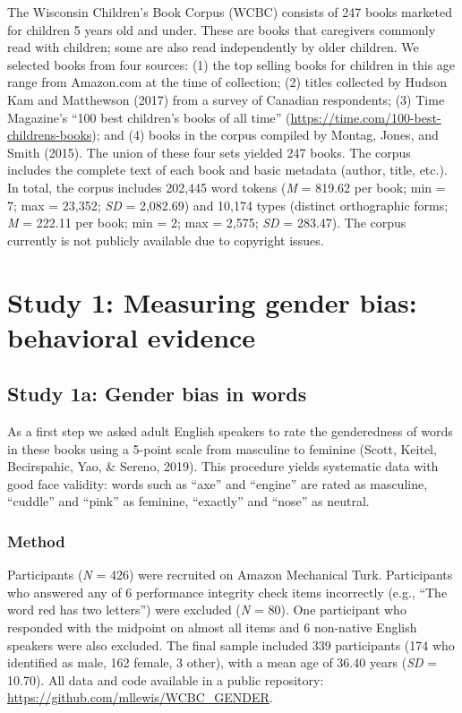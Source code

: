 \documentclass[
  english,
  ,man,floatsintext]{apa6}
\begin{document}
The Wisconsin Children's Book Corpus (WCBC) consists of 247 books marketed for children 5 years old and under. These are books that caregivers commonly read with children; some are also read independently by older children. We selected books from four sources: (1) the top selling books for children in this age range from Amazon.com at the time of collection; (2) titles collected by Hudson Kam and Matthewson (2017) from a survey of Canadian respondents; (3) Time Magazine's ``100 best children's books of all time'' (\url{https://time.com/100-best-childrens-books}); and (4) books in the corpus compiled by Montag, Jones, and Smith (2015). The union of these four sets yielded 247 books. The corpus includes the complete text of each book and basic metadata (author, title, etc.). In total, the corpus includes 202,445 word tokens (\emph{M} = 819.62 per book; min = 7; max = 23,352; \emph{SD} = 2,082.69) and 10,174 types (distinct orthographic forms; \emph{M} = 222.11 per book; min = 2; max = 2,575; \emph{SD} = 283.47). The corpus currently is not publicly available due to copyright issues.

\hypertarget{study-1-measuring-gender-bias-behavioral-evidence}{%
\section{Study 1: Measuring gender bias: behavioral evidence}\label{study-1-measuring-gender-bias-behavioral-evidence}}

\hypertarget{study-1a-gender-bias-in-words}{%
\subsection{Study 1a: Gender bias in words}\label{study-1a-gender-bias-in-words}}

As a first step we asked adult English speakers to rate the genderedness of words in these books using a 5-point scale from masculine to feminine (Scott, Keitel, Becirspahic, Yao, \& Sereno, 2019). This procedure yields systematic data with good face validity: words such as ``axe'' and ``engine'' are rated as masculine, ``cuddle'' and ``pink'' as feminine, ``exactly'' and ``nose'' as neutral.

\hypertarget{method-1}{%
\subsubsection{Method}\label{method-1}}

Participants (\emph{N} = 426) were recruited on Amazon Mechanical Turk. Participants who answered any of 6 performance integrity check items incorrectly (e.g., ``The word red has two letters'') were excluded (\emph{N} = 80). One participant who responded with the midpoint on almost all items and 6 non-native English speakers were also excluded. The final sample included 339 participants (174 who identified as male, 162 female, 3 other), with a mean age of 36.40 years (\emph{SD} = 10.70). All data and code available in a public repository: \url{https://github.com/mllewis/WCBC_GENDER}.
\end{document}
